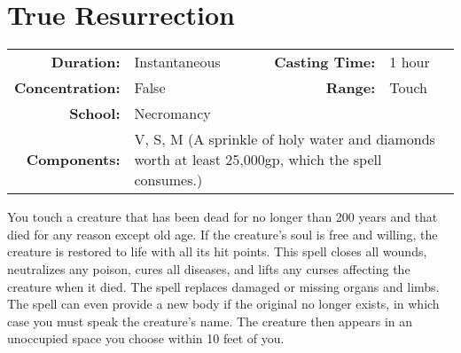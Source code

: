 \documentclass[a5paper, 12pt]{memoir}
\begin{document}
\newpage
\section*{True Resurrection}

{
\small\centering\vspace{-6pt}
\begin{tabular}{rlrl}
\toprule

\textbf{Duration:} & Instantaneous &
\textbf{Casting Time:} & 1 hour \\
\textbf{Concentration:} & False &
\textbf{Range:} & Touch \\
\textbf{School:} & Necromancy \\
\textbf{Components:} & \multicolumn{3}{p{0.7\textwidth}}{V, S, M (A sprinkle of holy water and diamonds worth at least 25,000gp, which the spell consumes.)}\\

\bottomrule
\end{tabular}
}

\vspace{1\baselineskip}\noindent You touch a creature that has been dead for no longer than 200 years and that died for any reason except old age. If the creature's soul is free and willing, the creature is restored to life with all its hit points. This spell closes all wounds, neutralizes any poison, cures all diseases, and lifts any curses affecting the creature when it died. The spell replaces damaged or missing organs and limbs. The spell can even provide a new body if the original no longer exists, in which case you must speak the creature's name. The creature then appears in an unoccupied space you choose within 10 feet of you.

\newpage
\end{document}
